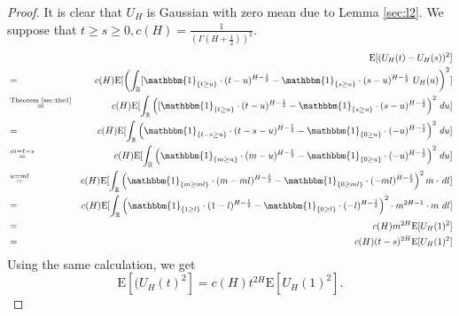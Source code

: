 \documentclass[a4paper, twoside, 11pt]{article}
\theoremstyle{definition}
\newcommand{\brkt}[1]{\left({#1} \right)}
\begin{document}
\begin{proof}
  It is clear that $U_H$ is Gaussian with zero mean due to Lemma \ref{sec:l2}. We suppose that $t \ge s \ge 0,  c(H)=\frac{1}{(\Gamma(H+\frac{1}{2}))^2}$.
  \begin{eqnarray}
	&&\mathrm{E}[(U_H(t) - U_H(s))^2]\nonumber\\
	&=& c(H)\mathrm{E}[\brkt{\int_{\mathbb{R}} [\mathbbm{1}_{\{t\ge u\}}\cdot(t-u)^{H-\frac{1}{2}}  - \mathbbm{1}_{\{s\ge u\}}\cdot(s-u)^{H-\frac{1}{2}} \,\mathop{U_H(u)}}^2]\nonumber\\
	&\overset{\text{Theorem \ref{sec:the1}}}{=}& c(H)\mathrm{E}[\int_{\mathbb{R}} \brkt{[\mathbbm{1}_{\{t\ge u\}}\cdot(t-u)^{H-\frac{1}{2}}  - \mathbbm{1}_{\{s\ge u\}}\cdot(s-u)^{H-\frac{1}{2}}}^2 \,\mathop{du}]\nonumber\\
	&=& c(H)\mathrm{E}[\int_{\mathbb{R}} \brkt{\mathbbm{1}_{\{t-s \ge u\}}\cdot(t-s-u)^{H-\frac{1}{2}}  - \mathbbm{1}_{\{0\ge u\}}\cdot(-u)^{H-\frac{1}{2}}}^2 \,\mathop{du}]\nonumber\\
	&\overset{m=t-s}{=}& c(H)\mathrm{E}[\int_{\mathbb{R}} \brkt{\mathbbm{1}_{\{m \ge u\}}\cdot(m-u)^{H-\frac{1}{2}}  - \mathbbm{1}_{\{0\ge u\}}\cdot(-u)^{H-\frac{1}{2}}}^2 \,\mathop{du}]\nonumber\\
	&\overset{u=ml}{=}& c(H)\mathrm{E}[\int_{\mathbb{R}} \brkt{\mathbbm{1}_{\{m \ge ml\}}\cdot(m-ml)^{H-\frac{1}{2}}  - \mathbbm{1}_{\{0\ge ml\}}\cdot(-ml)^{H-\frac{1}{2}}}^2 m\cdot\,\mathop{dl}]\nonumber\\
	&=& c(H)\mathrm{E}[\int_{\mathbb{R}} \brkt{\mathbbm{1}_{\{1 \ge l \}}\cdot(1-l)^{H-\frac{1}{2}}  - \mathbbm{1}_{\{0\ge l\}}\cdot(-l)^{H-\frac{1}{2}}}^2 \cdot m^{2H-1}\cdot m\,\mathop{dl}]\nonumber\\
	&=& c(H)m^{2H}\mathrm{E}[U_H(1)^2]\nonumber\\
	&=& c(H)(t-s)^{2H}\mathrm{E}[U_H(1)^2]
	\label{sec:eqn1}
  \end{eqnarray}
  Using the same calculation, we get
  \begin{equation}
	\mathrm{E}[(U_H(t)^2] = c(H)t^{2H}\mathrm{E}[U_H(1)^2].
	\label{sec:eqn2}
  \end{equation}


\end{proof}
\end{document}
